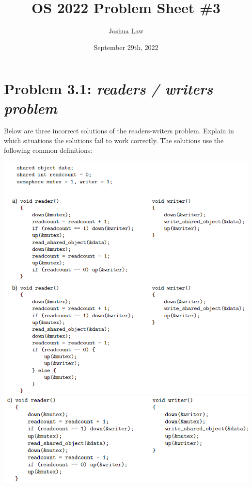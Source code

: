 \documentclass[
	12pt, %
]{fphw}
\title{OS 2022 Problem Sheet \#3} %
\author{Joshua Law} %
\date{September 29th, 2022} %
\institute{Jacobs University Bremen \\ Bachelor Of Computer Science} %
\begin{document}
\maketitle %


\section*{Problem 3.1: \emph{readers / writers problem }}

\begin{problem}
Below are three incorrect solutions of the readers-writers problem. Explain in which situations the solutions fail to work correctly. The solutions use the following common definitions:\end{problem}
\begin{center}
\includegraphics[width=0.8\columnwidth]{Screenshot 2022-09-27 144827.png}
\includegraphics*[width=0.8\columnwidth]{Screenshot 2022-09-27 144929.png}
\end{center}
\end{document}
